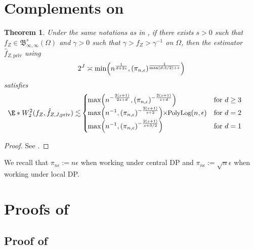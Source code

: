 \documentclass{article}
\newcommand{\1}{\mathds{1}}
\DeclarePairedDelimiter{\paren}{\lparen}{\rparen}
\theoremstyle{plain}
\newtheorem{theorem}{Theorem}[section]
\theoremstyle{definition}
\theoremstyle{remark}
\begin{document}
\newpage
\appendix

\section{Complements on }

\begin{theorem}
\label{th:utility_density_estimation}
    Under the same notations as in , if there exists $s > 0$ such that $f_Z \in \mathfrak B_{\infty, \infty}^s(\Omega)$ and $\gamma > 0$ such that $\gamma > f_Z > \gamma^{-1}$ on $\Omega$, then the estimator $\hat{f}_{Z, \textrm{priv}}$ using
    $$ 2^J \asymp \min \paren*{n^{\frac{1}{d + 2s}}, (\pi_{n,\epsilon})^{\frac{1}{\max(d;3/2)+s}}} $$
satisfies 
\begin{align*}
   \E*{W_2^2(f_Z, \hat{f}_{Z, J, \textrm{priv}})} \lesssim 
    &
    \left\{
    \hspace*{-0.2cm}\begin{array}{ll}
       \max \paren*{n^{- \frac{2 (s + 1)}{ 2 s + d}}, (\pi_{n,\epsilon})^{- \frac{2 (s + 1)}{ s + d}}}   &  \text{for $d\geq 3 $}\\
             \max \paren*{n^{-1}, (\pi_{n,\epsilon})^{- \frac{2 (s + 1)}{ s + 2}}} \hspace*{-0.1cm}  \times \hspace*{-0.1cm} \textrm{\small PolyLog}(n, \epsilon) & \text{for $d = 2 $ }\\
     \max \paren*{n^{- 1 }, (\pi_{n,\epsilon})^{- \frac{2 (s + 1)}{ s + 3/2}}} &  \text{for $d = 1 $ }
    \end{array} \right.
\end{align*}
\end{theorem}
\begin{proof}
    See .
\end{proof}

 We recall that $\pi_{n \epsilon} := n \epsilon$ when working under central DP and $\pi_{n \epsilon} := \sqrt{n} \epsilon$ when working under local DP.

\section{Proofs of }
\label{proofs_of_sec:density_estimation_wasserstein}

\subsection{Proof of }
\label{proof_of_prop:sensitivity}
\end{document}

